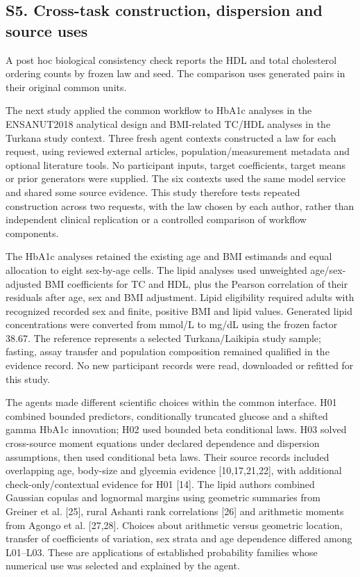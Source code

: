 \documentclass[sigconf,review]{acmart}
\begin{document}
\subsection*{S5. Cross-task construction, dispersion and source uses}

A post hoc biological consistency check reports the HDL and total cholesterol ordering counts by frozen law and seed. The comparison uses generated pairs in their original common units.


The next study applied the common workflow to HbA1c analyses in the ENSANUT2018 analytical design and BMI-related TC/\allowbreak{}HDL analyses in the Turkana study context. Three fresh agent contexts constructed a law for each request, using reviewed external articles, population/\allowbreak{}measurement metadata and optional literature tools. No participant inputs, target coefficients, target means or prior generators were supplied. The six contexts used the same model service and shared some source evidence. This study therefore tests repeated construction across two requests, with the law chosen by each author, rather than independent clinical replication or a controlled comparison of workflow components.


The HbA1c analyses retained the existing age and BMI estimands and equal allocation to eight sex-by-age cells. The lipid analyses used unweighted age/\allowbreak{}sex-adjusted BMI coefficients for TC and HDL, plus the Pearson correlation of their residuals after age, sex and BMI adjustment. Lipid eligibility required adults with recognized recorded sex and finite, positive BMI and lipid values. Generated lipid concentrations were converted from mmol/\allowbreak{}L to mg/\allowbreak{}dL using the frozen factor 38.67. The reference represents a selected Turkana/\allowbreak{}Laikipia study sample; fasting, assay transfer and population composition remained qualified in the evidence record. No new participant records were read, downloaded or refitted for this study.


The agents made different scientific choices within the common interface. H01 combined bounded predictors, conditionally truncated glucose and a shifted gamma HbA1c innovation; H02 used bounded beta conditional laws. H03 solved cross-source moment equations under declared dependence and dispersion assumptions, then used conditional beta laws. Their source records included overlapping age, body-size and glycemia evidence [10,17,21,22], with additional check-only/\allowbreak{}contextual evidence for H01 [14]. The lipid authors combined Gaussian copulas and lognormal margins using geometric summaries from Greiner et al. [25], rural Ashanti rank correlations [26] and arithmetic moments from Agongo et al. [27,28]. Choices about arithmetic versus geometric location, transfer of coefficients of variation, sex strata and age dependence differed among L01–\allowbreak{}L03. These are applications of established probability families whose numerical use was selected and explained by the agent.
\end{document}
